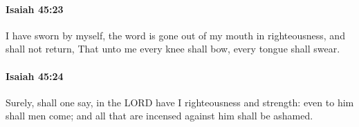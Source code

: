 		\paragraph{Isaiah 45:23} %
			\label{ISAIAH-45-23}

			I have sworn by myself, the word is gone out of my mouth in righteousness, and shall not return, That unto me every knee shall bow, every tongue shall swear.


		\paragraph{Isaiah 45:24} %
			\label{ISAIAH-45-24}

			Surely, shall one say, in the LORD have I righteousness and strength: even to him shall men come; and all that are incensed against him shall be ashamed.



